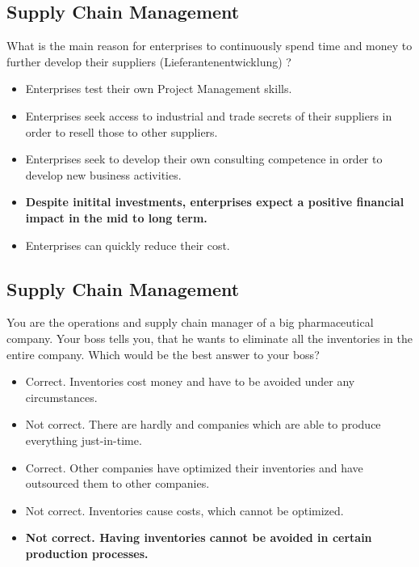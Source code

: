 \subsection{Supply Chain Management}
What is the main reason for enterprises to continuously spend time and money to further develop their suppliers (Lieferantenentwicklung) ? 
\begin{itemize}
	\item Enterprises test their own Project Management skills.
	\item Enterprises seek access to industrial and trade secrets of their suppliers in order to resell those to other suppliers. 
	\item Enterprises seek to develop their own consulting competence in order to develop new business activities. 
	\item \textbf{Despite initital investments, enterprises expect a positive financial impact in the mid to long term. }
\item Enterprises can quickly reduce their cost. 
\end{itemize}
\subsection{Supply Chain Management}
You are the operations and supply chain manager of a big pharmaceutical company. Your boss tells you, that he wants to eliminate all the inventories in the entire company. Which would be the best answer to your boss?
\begin{itemize}
	\item Correct. Inventories cost money and have to be avoided under any circumstances.
	\item Not correct. There are hardly and companies which are able to produce everything just-in-time. 
	\item Correct. Other companies have optimized their inventories and have outsourced them to other companies.
	\item Not correct. Inventories cause costs, which cannot be optimized.
	\item \textbf{Not correct. Having inventories cannot be avoided in certain production processes. }
\end{itemize}
